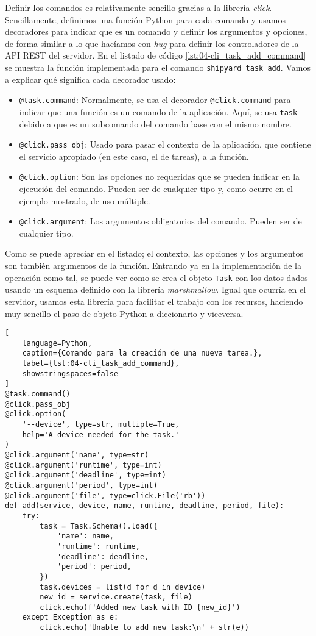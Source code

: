Definir los comandos es relativamente sencillo gracias a la librería
\textit{click}. Sencillamente, definimos una función Python para cada comando y
usamos decoradores para indicar que es un comando y definir los argumentos y
opciones, de forma similar a lo que hacíamos con \textit{hug} para definir los
controladores de la API REST del servidor. En el listado de código
\ref{lst:04-cli_task_add_command} se muestra la función implementada para el
comando \texttt{shipyard task add}. Vamos a explicar qué significa cada
decorador usado:

\begin{itemize}
    \item \texttt{@task.command}: Normalmente, se usa el decorador
          \texttt{@click.command} para indicar que una función es un comando de la
          aplicación. Aquí, se usa \texttt{task} debido a que es un subcomando del
          comando base con el mismo nombre.
    \item \texttt{@click.pass\_obj}: Usado para pasar el contexto de la
          aplicación, que contiene el servicio apropiado (en este caso, el de tareas),
          a la función.
    \item \texttt{@click.option}: Son las opciones no requeridas que se pueden
          indicar en la ejecución del comando. Pueden ser de cualquier tipo y, como
          ocurre en el ejemplo mostrado, de uso múltiple.
    \item \texttt{@click.argument}: Los argumentos obligatorios del comando.
          Pueden ser de cualquier tipo.
\end{itemize}

Como se puede apreciar en el listado; el contexto, las opciones y los argumentos
son también argumentos de la función. Entrando ya en la implementación de la
operación como tal, se puede ver como se crea el objeto \texttt{Task} con los
datos dados usando un esquema definido con la librería \textit{marshmallow}.
Igual que ocurría en el servidor, usamos esta librería para facilitar el trabajo
con los recursos, haciendo muy sencillo el paso de objeto Python a diccionario y
viceversa.

\begin{lstlisting}[
    language=Python,
    caption={Comando para la creación de una nueva tarea.},
    label={lst:04-cli_task_add_command},
    showstringspaces=false
]
@task.command()
@click.pass_obj
@click.option(
    '--device', type=str, multiple=True,
    help='A device needed for the task.'
)
@click.argument('name', type=str)
@click.argument('runtime', type=int)
@click.argument('deadline', type=int)
@click.argument('period', type=int)
@click.argument('file', type=click.File('rb'))
def add(service, device, name, runtime, deadline, period, file):
    try:
        task = Task.Schema().load({
            'name': name,
            'runtime': runtime,
            'deadline': deadline,
            'period': period,
        })
        task.devices = list(d for d in device)
        new_id = service.create(task, file)
        click.echo(f'Added new task with ID {new_id}')
    except Exception as e:
        click.echo('Unable to add new task:\n' + str(e))
\end{lstlisting}

